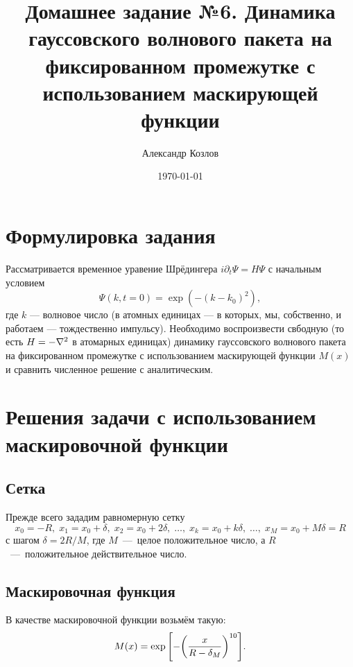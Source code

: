 \documentclass[10pt]{article}
\title{Домашнее задание №6. Динамика гауссовского волнового пакета на фиксированном промежутке с использованием маскирующей функции}
\author{Александр Козлов}
\date{\today}
\begin{document}
\maketitle

\section*{Формулировка задания}

Рассматривается временное уравение Шрёдингера $i \partial_t \Psi = H \Psi$ с начальным условием $$\Psi(k,t=0) = \exp(-(k-k_0)^2),$$ где $k$ --- волновое число (в атомных единицах --- в которых, мы, собственно, и работаем --- тождественно импульсу). Необходимо воспроизвести свбодную (то есть $H=-\laplacian$ в атомарных единицах) динамику гауссовского волнового пакета на фиксированном промежутке с использованием маскирующей функции $M(x)$ и сравнить численное решение с аналитическим.

\section{Решения задачи с использованием маскировочной функции}

\subsection*{Сетка}
Прежде всего зададим равномерную сетку
\begin{equation}
	x_0 = -R,\; x_1 = x_0 + \delta,\; x_2 = x_0 + 2\delta,\; \ldots,\; x_k = x_0 + k\delta,\; \ldots,\; x_M = x_0 + M \delta = R
\end{equation}
с шагом $\delta = 2R/M$, где $M$~---~целое положительное число, а $R$~---~положительное действительное число.

\subsection*{Маскировочная функция}
В качестве маскировочной функции возьмём такую:
\begin{equation}
	M(x) = \exp\qty[-\qty(\dfrac{x}{R-\delta_M})^{10}].
\end{equation}
\end{document}
